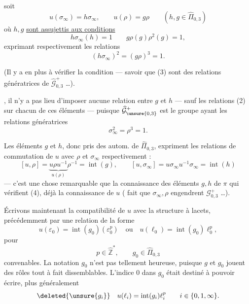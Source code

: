 soit
\[
\tag{1}
\boxed{u(\sigma_\infty)=h\sigma_\infty,\qquad u(\rho)=g\rho}
\qquad (h,g\in\widehat{\Pi}_{0,3})
\]
où $h,g$ \uline{sont assujettis aux conditions}
\[
\tag{2}
\boxed{h\sigma_\infty(h)=1\qquad g\rho(g)\rho^2(g)=1},
\]
exprimant respectivement les relations
\[
\tag{3}
\boxed{(h\sigma_\infty)^2=(g\rho)^3=1}.
\]

(Il y a en plus à vérifier la condition  --- savoir que (3) sont des relations génératrices de $\widehat{\mathcal G}_{0,3}^{+}$ \dots).

, il n'y a pas lieu d'imposer aucune relation entre $g$ et $h$ --- sauf les relations (2) sur chacun de ces éléments --- puisque $\widehat{\mathcal G}_{\unsure{0,3}}^{+}$ est le groupe ayant les relations génératrices
\[
\sigma_\infty^2=\rho^3=1.
\]



Les éléments $g$ et $h$, donc pris  des autom. de $\widehat{\Pi}_{0,3}$, expriment les relations de commutation de $u$ avec \deleted{$\sigma_\infty$} $\rho$ et $\sigma_\infty$ respectivement :
\[
\tag{4}
[u,\rho]=\underbrace{u\rho u^{-1}}_{u(\rho)}\rho^{-1}=\operatorname{int}(g),
\qquad
[u,\sigma_\infty]=u\sigma_\infty u^{-1}\sigma_\infty=\operatorname{int}(h)
\]
--- c'est une chose remarquable que la connaissance des éléments $g,h$ de $\pi$ qui vérifient (4), \uline{} déjà la connaissance de $u$ (  fait que $\sigma_\infty,\rho$ engendrent $\mathcal G_{0,3}^{+}$ \dots).

Écrivons maintenant la compatibilité de $u$ avec la structure à lacets,   précédemment par une relation de la forme
\[
u(\varepsilon_0)=\operatorname{int}(g_0)(\varepsilon_0^p)
\quad\text{ou}\quad
u(\ell_0)=\operatorname{int}(g_0)\ell_0^p,
\]
pour
\[
p\in\widehat{\mathbb Z}^{*},\qquad g_0\in\widehat{\Pi}_{0,3}
\]
convenables. La notation $g_0$ n'est pas tellement heureuse, puisque $g$ et $g_0$ jouent des rôles tout à fait dissemblables. L'indice $0$ dans $g_0$ était destiné à pouvoir écrire, plus généralement
\[
\deleted{\unsure{g_i}}\quad
u(\ell_i)=\operatorname{int}(g_i)\ell_i^p
\qquad i\in\{0,1,\infty\}.
\]



